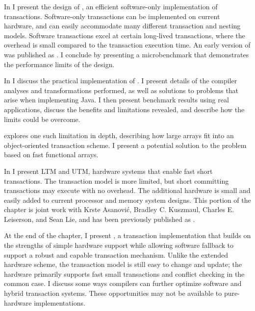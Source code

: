 In  I present the design of \apex, an efficient software-only
implementation of transactions.  Software-only transactions can be
implemented on current hardware, and can easily accommodate many
different transaction and nesting models.  Software transactions excel
at certain long-lived transactions, where the overhead is
small compared to the transaction execution time.  An early version of
\apex was published as \cite{Ananian05}.
I conclude by
presenting a microbenchmark that demonstrates the performance limits of
the design.

In  I discuss the practical implementation of
\apex.  I present details of the compiler
analyses and transformations performed, as well as solutions to
problems that arise when implementing Java.  I then present
benchmark results using real applications, discuss the benefits and
limitations revealed, and describe how the limits could be overcome.

 explores one such limitation in depth,
describing how large arrays fit into an object-oriented transaction
scheme.  I present a potential solution to the problem based on
fast functional arrays.

In  I present LTM and UTM, hardware systems that enable fast
short transactions.  The transaction model is more limited, but short
committing transactions may execute with no overhead.  The additional
hardware is small and easily added to current processor and memory
system designs.  This portion of the chapter is joint work with Krste
Asanovi\'c, 
Bradley C. Kuszmaul, Charles E. Leiserson, and Sean Lie, and has been
previously published as \cite{AnanianAsKuLeLi05,AnanianAsKuLeLi06}.


At the end of the chapter,
I present \hyx, a  transaction implementation
that builds on the strengths of simple hardware support while
allowing software fallback to support a robust and capable transaction
mechanism.  Unlike the extended hardware scheme, the transaction model
is still easy to change and update; the hardware primarily supports
fast small transactions and conflict checking in the common case.
I discuss some ways compilers can further
optimize software and hybrid transaction systems.  These opportunities
may not be available to pure-hardware implementations.

